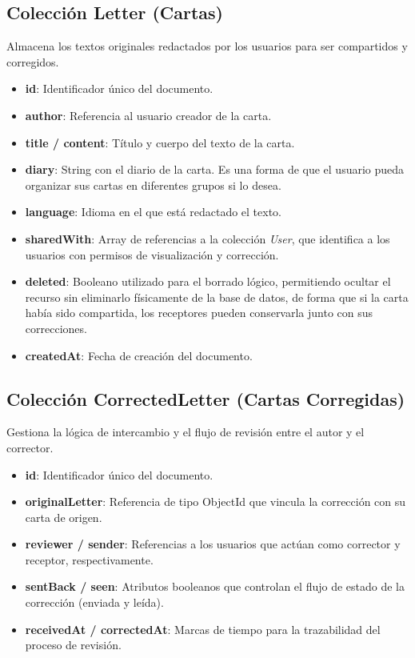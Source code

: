 \subsection{Colección Letter (Cartas)}
Almacena los textos originales redactados por los usuarios para ser compartidos y corregidos.

\begin{itemize}
    \item \textbf{id}: Identificador único del documento.
    \item \textbf{author}: Referencia al usuario creador de la carta.
    \item \textbf{title / content}: Título y cuerpo del texto de la carta.
    \item \textbf{diary}: String con el diario de la carta. Es una forma de que el usuario pueda organizar sus cartas en diferentes grupos si lo desea.
    \item \textbf{language}: Idioma en el que está redactado el texto.
    \item \textbf{sharedWith}: Array de referencias a la colección \textit{User}, que identifica a los usuarios con permisos de visualización y corrección.
    \item \textbf{deleted}: Booleano utilizado para el borrado lógico, permitiendo ocultar el recurso sin eliminarlo físicamente de la base de datos, de forma que si la carta había sido compartida, los receptores pueden conservarla junto con sus correcciones.
    \item \textbf{createdAt}: Fecha de creación del documento.
\end{itemize}

\subsection{Colección CorrectedLetter (Cartas Corregidas)}
Gestiona la lógica de intercambio y el flujo de revisión entre el autor y el corrector.

\begin{itemize}
    \item \textbf{id}: Identificador único del documento.
    \item \textbf{originalLetter}: Referencia de tipo ObjectId que vincula la corrección con su carta de origen.
    \item \textbf{reviewer / sender}: Referencias a los usuarios que actúan como corrector y receptor, respectivamente.
    \item \textbf{sentBack / seen}: Atributos booleanos que controlan el flujo de estado de la corrección (enviada y leída).
    \item \textbf{receivedAt / correctedAt}: Marcas de tiempo para la trazabilidad del proceso de revisión.
\end{itemize}


